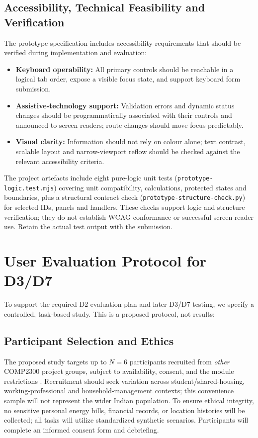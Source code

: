 \documentclass[12pt,a4paper]{article}
\newcommand{\code}[1]{\texttt{#1}}
\begin{document}
\subsection{Accessibility, Technical Feasibility and Verification}
The prototype specification includes accessibility requirements that should be verified during implementation and evaluation:
\begin{itemize}[leftmargin=*]
  \item \textbf{Keyboard operability:} All primary controls should be reachable in a logical tab order, expose a visible focus state, and support keyboard form submission.
  \item \textbf{Assistive-technology support:} Validation errors and dynamic status changes should be programmatically associated with their controls and announced to screen readers; route changes should move focus predictably.
  \item \textbf{Visual clarity:} Information should not rely on colour alone; text contrast, scalable layout and narrow-viewport reflow should be checked against the relevant accessibility criteria.
\end{itemize}
The project artefacts include eight pure-logic unit tests (\code{prototype-logic.test.mjs}) covering unit compatibility, calculations, protected states and boundaries, plus a structural contract check (\code{prototype-structure-check.py}) for selected IDs, panels and handlers. These checks support logic and structure verification; they do not establish WCAG conformance or successful screen-reader use. Retain the actual test output with the submission.

\section{User Evaluation Protocol for D3/D7}

To support the required D2 evaluation plan and later D3/D7 testing, we specify a controlled, task-based study. This is a proposed protocol, not results:

\subsection{Participant Selection and Ethics}
The proposed study targets up to $N=6$ participants recruited from \emph{other} COMP2300 project groups, subject to availability, consent, and the module restrictions \cite{modulebrief}. Recruitment should seek variation across student/shared-housing, working-professional and household-management contexts; this convenience sample will not represent the wider Indian population. To ensure ethical integrity, no sensitive personal energy bills, financial records, or location histories will be collected; all tasks will utilize standardized synthetic scenarios. Participants will complete an informed consent form and debriefing.
\end{document}
